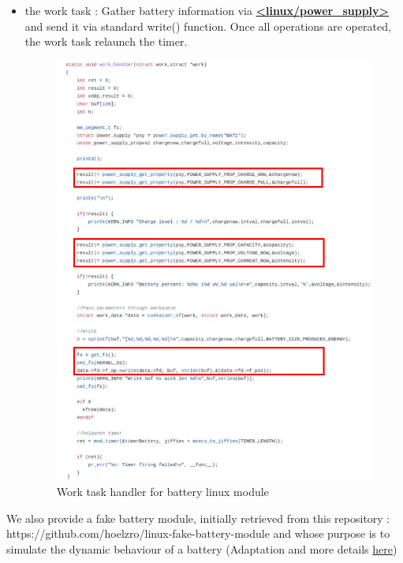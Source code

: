 \documentclass[12pt,hidelinks]{article}
\begin{document}
{\begin{itemize}
	    \newpage \item the work task : Gather battery information via \textbf {\href{https://www.kernel.org/doc/html/latest/power/power_supply_class.html}{<linux/power\_supply>}} and send it via standard write() function. Once all operations are operated, the work task relaunch the timer.\newline
	  
	    \begin{figure}[!h]
         \centering
    	\includegraphics[scale=0.6]{work_task.png}
    	\caption{Work task handler for battery linux module}
    	\end{figure} \newline
	  
  	\end{itemize}
	    
         
	    
	
	We also provide a fake battery module, initially retrieved from this repository : https://github.com/hoelzro/linux-fake-battery-module \newline and whose purpose is to simulate the dynamic behaviour of a battery (Adaptation and more details \href{https://github.com/skyultime/M2_ERTS_Project_xenomai_edh/tree/dev/SourceCode/fakeBatteryModule}{here})


}
\end{document}
